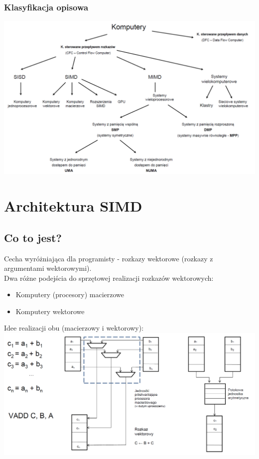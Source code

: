 \documentclass[a4paper,twoside]{article}
\begin{document}
		\subsubsection*{Klasyfikacja opisowa}
		\includegraphics[width=16cm]{klasyfikacja}
		\pagebreak
		
	\section*{Architektura SIMD}
		\subsection*{Co to jest?}
		Cecha wyróżniająca dla programisty - rozkazy wektorowe (rozkazy z argumentami wektorowymi).\\
		Dwa różne podejścia do sprzętowej realizacji rozkazów wektorowych:
		\begin{itemize}
			\item Komputery (procesory) macierzowe
			\item Komputery wektorowe
		\end{itemize}
		Idee realizacji obu (macierzowy i wektorowy):\\
		\includegraphics[width=16cm]{wektor_macierz}\\
\end{document}
